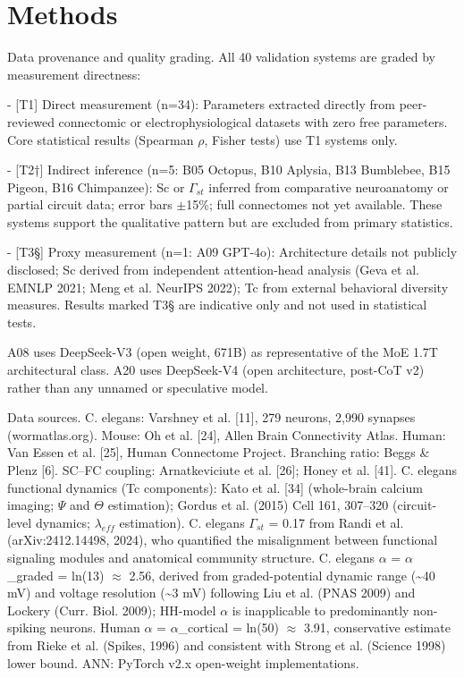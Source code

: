\documentclass[a4paper,12pt]{article}
\begin{document}
\section{Methods}

Data provenance and quality grading. All 40 validation systems are graded by measurement directness:


- [T1] Direct measurement (n=34): Parameters extracted directly from peer-reviewed connectomic or electrophysiological datasets with zero free parameters. Core statistical results (Spearman $\rho$, Fisher tests) use T1 systems only.


- [T2†] Indirect inference (n=5: B05 Octopus, B10 Aplysia, B13 Bumblebee, B15 Pigeon, B16 Chimpanzee): Sc or $\Gamma_{st}$ inferred from comparative neuroanatomy or partial circuit data; error bars $\pm$15\%; full connectomes not yet available. These systems support the qualitative pattern but are excluded from primary statistics.


- [T3§] Proxy measurement (n=1: A09 GPT-4o): Architecture details not publicly disclosed; Sc derived from independent attention-head analysis (Geva et al. EMNLP 2021; Meng et al. NeurIPS 2022); Tc from external behavioral diversity measures. Results marked T3§ are indicative only and not used in statistical tests.


A08 uses DeepSeek-V3 (open weight, 671B) as representative of the MoE 1.7T architectural class. A20 uses DeepSeek-V4 (open architecture, post-CoT v2) rather than any unnamed or speculative model.


Data sources.
C. elegans: Varshney et al. [11], 279 neurons, 2,990 synapses (wormatlas.org).
Mouse: Oh et al. [24], Allen Brain Connectivity Atlas.
Human: Van Essen et al. [25], Human Connectome Project.
Branching ratio: Beggs \& Plenz [6].
SC--FC coupling: Arnatkeviciute et al. [26]; Honey et al. [41].
C. elegans functional dynamics (Tc components): Kato et al. [34] (whole-brain calcium imaging; $\Psi$ and $\Theta$ estimation); Gordus et al. (2015) Cell 161, 307--320 (circuit-level dynamics; $\lambda_{eff}$ estimation).
C. elegans $\Gamma_{st}$ = 0.17 from Randi et al. (arXiv:2412.14498, 2024), who quantified the misalignment between functional signaling modules and anatomical community structure.
C. elegans $\alpha$ = $\alpha$_graded = ln(13) $\approx$ 2.56, derived from graded-potential dynamic range (\textasciitilde{}40 mV) and voltage resolution (\textasciitilde{}3 mV) following Liu et al. (PNAS 2009) and Lockery (Curr.
Biol. 2009); HH-model $\alpha$ is inapplicable to predominantly non-spiking neurons.
Human $\alpha$ = $\alpha$_cortical = ln(50) $\approx$ 3.91, conservative estimate from Rieke et al. (Spikes, 1996) and consistent with Strong et al. (Science 1998) lower bound.
ANN: PyTorch v2.x open-weight implementations.
\end{document}
